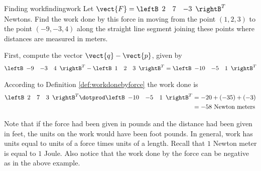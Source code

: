 \begin{example}{Finding work}{findingwork}
Let $\vect{F}=
\leftB
\begin{array}{rrr}
2 & 7 & -3
\end{array}
\rightB^T$ Newtons. Find the work
done by this force in moving from the point $\left( 1,2,3\right) $ to the
point $\left( -9,-3,4\right) $ along the straight line segment joining these
points where distances are measured in meters.
\end{example}

\begin{solution}
First, compute the vector $\vect{q} - \vect{p}$, given by 
\begin{equation*}
\leftB
\begin{array}{rrr}
-9 & -3 & 4
\end{array}
\rightB^T
-
\leftB
\begin{array}{rrr}
1 & 2 & 3
\end{array}
\rightB^T
=
\leftB
\begin{array}{rrr}
-10 & -5 & 1
\end{array}
\rightB^T
\end{equation*}

According to Definition \ref{def:workdonebyforce} the work done is
\begin{align*}
\leftB
\begin{array}{rrr}
2 & 7 & 3
\end{array}
\rightB^T
 \dotprod 
\leftB
\begin{array}{rrr}
-10 & -5 & 1
\end{array}
\rightB^T
& =-20+\left( -35\right) +\left(
-3\right) \\
& =-58\text{ Newton meters}
\end{align*}
\end{solution}

Note that if the force had been given in pounds and the distance had been
given in feet, the units on the work would have been foot pounds. In
general, work has units equal to units of a force times units of a length.
Recall that $1$ Newton meter is equal to $1$ Joule.  Also notice that the work done by the force can be negative as in the
above example.
